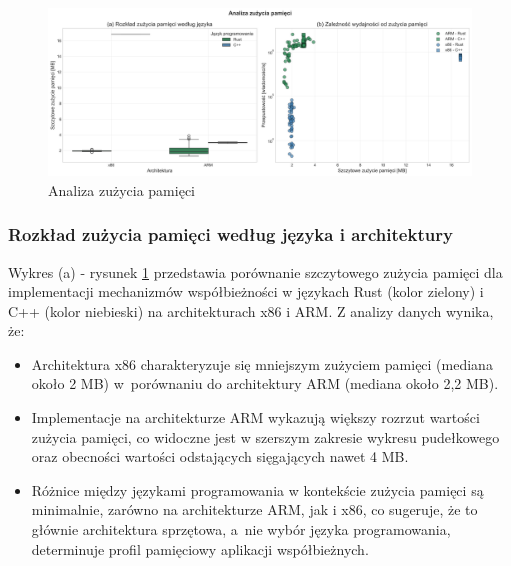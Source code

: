 \begin{figure}[H]
    \centering
    \includegraphics[width=\textwidth]{analiza/images/conc/pc/compare/rysunek_3_zuzycie_pamieci.png}
    \caption{Analiza zużycia pamięci}
    \label{rysunek_3_zuzycie_pamieci}
\end{figure}

\subsubsection{Rozkład zużycia pamięci według języka i architektury}
Wykres (a) - rysunek \ref{rysunek_3_zuzycie_pamieci} przedstawia porównanie szczytowego zużycia pamięci dla implementacji mechanizmów współbieżności w językach Rust (kolor zielony) i C++ (kolor niebieski) na architekturach x86 i ARM. Z analizy danych wynika, że:
\begin{itemize}
    \item Architektura x86 charakteryzuje się mniejszym zużyciem pamięci (mediana około 2 MB) w~porównaniu do architektury ARM (mediana około 2,2 MB).
    \item Implementacje na architekturze ARM wykazują większy rozrzut wartości zużycia pamięci, co widoczne jest w szerszym zakresie wykresu pudełkowego oraz obecności wartości odstających sięgających nawet 4 MB.
    \item Różnice między językami programowania w kontekście zużycia pamięci są minimalnie, zarówno na architekturze ARM, jak i x86, co sugeruje, że to głównie architektura sprzętowa, a~nie wybór języka programowania, determinuje profil pamięciowy aplikacji współbieżnych.
\end{itemize}

